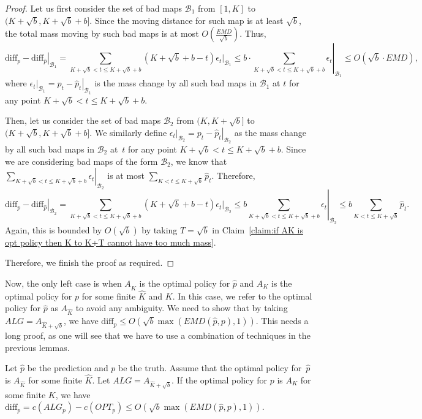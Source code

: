 \begin{proof}
    Let us first consider the set of bad maps $\mathcal{B}_1$ from $[1,K]$ to $(K+\sqrt{b},K+\sqrt{b}+b]$. Since the moving distance for such map is at least $\sqrt{b}$, the total mass moving by such bad maps is at most $O(\frac{EMD}{\sqrt{b}})$. Thus, 
    $$\left. \text{diff}_p - \text{diff}_{\hat{p}} \right|_{\mathcal{B}_1} = \sum_{ K+\sqrt{b}<t \leq K+\sqrt{b}+b}(K+\sqrt{b}+b-t)\left. \epsilon_t \right|_{\mathcal{B}_1} \leq b \cdot \left. \sum_{ K+\sqrt{b}<t \leq K+\sqrt{b}+b} \epsilon_t \right|_{\mathcal{B}_1} \leq O(\sqrt{b} \cdot EMD),$$
    where $\left. \epsilon_t \right|_{\mathcal{B}_1} = \left. p_t - \hat{p}_t \right|_{\mathcal{B}_1}$ is the mass change by all such bad maps in $\mathcal{B}_1$ at $t$ for any point $K+\sqrt{b}<t \leq K+\sqrt{b}+b$.

    Then, let us consider the set of bad maps $\mathcal{B}_2$ from $(K,K+\sqrt{b}]$ to $(K+\sqrt{b},K+\sqrt{b}+b]$. We similarly define $\left. \epsilon_t \right|_{\mathcal{B}_2} = \left. p_t - \hat{p}_t \right|_{\mathcal{B}_2}$ as the mass change by all such bad maps in $\mathcal{B}_2$ at~$t$ for any point $K+\sqrt{b}<t \leq K+\sqrt{b}+b$.
    Since we are considering bad maps of the form $\mathcal{B}_2$, we know that $\left. \sum_{ K+\sqrt{b}<t \leq K+\sqrt{b}+b} \epsilon_t \right|_{\mathcal{B}_2}$ is at most $\sum_{K<t \leq K+\sqrt{b}}\hat{p}_t$. Therefore, 
    $$\left. \text{diff}_p - \text{diff}_{\hat{p}} \right|_{\mathcal{B}_2} = \sum_{ K+\sqrt{b}<t \leq K+\sqrt{b}+b}(K+\sqrt{b}+b-t)\left. \epsilon_t \right|_{\mathcal{B}_2} \leq b \left. \sum_{ K+\sqrt{b}<t \leq K+\sqrt{b}+b} \epsilon_t \right|_{\mathcal{B}_2} \leq b \sum_{K<t \leq K+\sqrt{b}}\hat{p}_t.$$
    Again, this is bounded by $O(\sqrt{b})$ by taking $T=\sqrt{b}$ in Claim~\ref{claim:if AK is opt policy then K to K+T cannot have too much mass}.

    Therefore, we finish the proof as required.
\end{proof}

Now, the only left case is when $A_{\hat{K}}$ is the optimal policy for $\hat{p}$ and $A_K$ is the optimal policy for $p$ for some finite $\hat{K}$ and $K$. In this case, we refer to the optimal policy for $\hat{p}$ as $A_{\hat{K}}$ to avoid any ambiguity. We need to show that by taking $ALG = A_{\hat{K}+\sqrt{b}}$, we have $\text{diff}_p \leq O(\sqrt{b} \max(EMD(\hat{p},p),1))$. This needs a long proof, as one will see that we have to use a combination of techniques in the previous lemmas.

\begin{lemma}
    \label{lm:phat is AKhat and p is AK root b loss}
    Let $\hat{p}$ be the prediction and $p$ be the truth. Assume that the optimal policy for~$\hat{p}$ is $A_{\hat{K}}$ for some finite $\hat{K}$. Let $ALG = A_{\hat{K}+\sqrt{b}}$. If the optimal policy for $p$ is $A_K$ for some finite $K$, we have $\text{diff}_p = c(ALG_p) - c(OPT_p) \leq O(\sqrt{b} \max(EMD(\hat{p},p),1))$.
\end{lemma}

